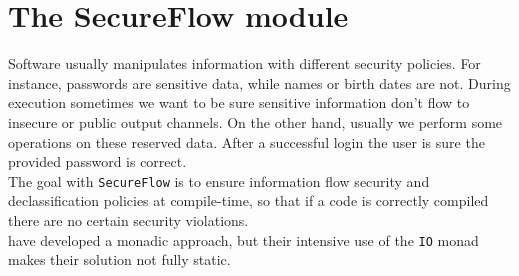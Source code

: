 \section{The SecureFlow module}\label{sec:flow}
Software usually manipulates information with different security policies. For instance, passwords are sensitive data, while names or birth dates are not. During execution sometimes we want to be sure sensitive information don't flow to insecure or public output channels. On the other hand, usually we perform some operations on these reserved data. After a successful login the user is sure the provided password is correct. \\
The goal with \texttt{SecureFlow} is to ensure information flow security and declassification policies at compile-time, so that if a code is correctly compiled there are no certain security violations. \\
\citeauthor{russo2008library} \cite{russo2008library} have developed a monadic approach, but their intensive use of the \texttt{IO} monad makes their solution not fully static.

